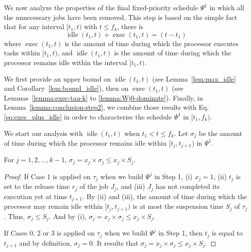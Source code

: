 
We now analyze the properties of the final fixed-priority schedule $\Psi^1$ in which
all the unnecessary jobs have been removed. %
This step is based on the simple fact that for any interval $[t_1, t)$ with $t \leq f_k$, there is 
\begin{equation}
\label{eq:exec_plus_idle}
\operatorname{idle}(t_1, t) + \operatorname{exec}(t_1, t)  = (t - t_1)
\end{equation}
where $\operatorname{exec}(t_1, t)$ is the amount of time during which the processor executes tasks within $[t_1, t)$, and $\operatorname{idle}(t_1, t)$ is the amount of time during which the processor remains idle within the interval $[t_1, t)$.

We first provide an upper bound on $\operatorname{idle}(t_1, t)$ (see Lemma~\ref{lem:max_idle} and Corollary~\ref{lem:bound_idle}), then on $\operatorname{exec}(t_1, t)$ (see Lemmas~\ref{lemma:exec-tau-k} to \ref{lemma:Wj0-dominate}). Finally, in Lemma~\ref{lemma:conclusion-step2}, we combine those results with Eq. \eqref{eq:exec_plus_idle} in order to characterise the schedule $\Psi^1$ in $[t_1, f_k)$.

We start our analysis with $\operatorname{idle}(t_1, t)$ when $t_1 < t \leq f_k$.
Let $\sigma_j$ be the amount of time during which the processor remains idle within $[t_j, t_{j+1})$ in $\Psi^1$. 
\begin{Lemma}
\label{lem:max_idle}
For $j=1,2,\ldots,k-1$, $\sigma_j  = x_j \times \sigma_j \leq x_j \times S_j$. %
\end{Lemma}
\begin{proof}
If Case 1 is applied on $\tau_j$ when we build $\Psi^j$ in Step 1, (i) $x_j = 1$, (ii) $t_j$ is set to the release time $r_j$ of the job $J_j$, and (iii) $J_j$ has not completed its execution yet at time $t_{j+1}$. By (ii) and (iii), the
  amount of time during which the processor may remain idle within
  $[t_j, t_{j+1})$ is at most the suspension time $S_j$ of $\tau_j$. Thus, $\sigma_j \leq S_j$. And by (i), $\sigma_j = x_j \times \sigma_j \leq x_j \times S_j$.
  
  If Cases 0, 2 or 3 is applied on $\tau_j$ when we build $\Psi^j$ in Step 1, then $t_j$ is equal to $t_{j+1}$ and by definition, $\sigma_j= 0$. It results that $\sigma_j= x_j \times \sigma_j \leq x_j \times S_j$.  
\end{proof}

